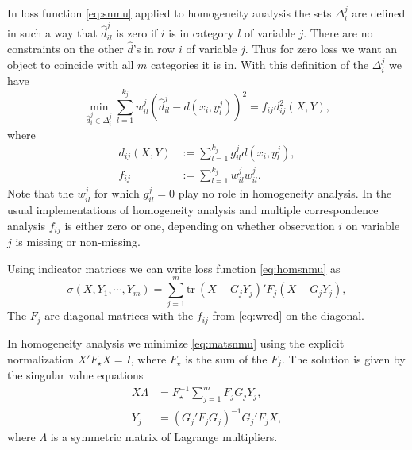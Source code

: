 \documentclass[
  12pt,
]{article}
\begin{document}
In loss function \eqref{eq:snmu} applied to homogeneity analysis
the sets \(\Delta_i^j\) are defined in such a way that \(\hat d_{il}^j\) is zero if \(i\) is in category \(l\) of
variable \(j\). There are no constraints on the other \(\hat d\)'s in row \(i\)
of variable \(j\). Thus for zero loss we want an object to coincide with all \(m\) categories it is in. With this definition of the \(\Delta_i^j\) we have
\begin{equation}
\min_{\hat d_i^j\in\Delta_i^j}\sum_{l=1}^{k_j}w_{il}^j(\hat d_{il}^j-d(x_i,y_l^j))^2=f_{ij}d_{ij}^2(X,Y),
\label{eq:homsnmu}
\end{equation}
where
\begin{subequations}
\begin{align}
d_{ij}(X,Y)&:=\sum_{l=1}^{k_j}g_{il}^jd(x_i,y^j_l),\label{eq:dred}\\
f_{ij}&:=\sum_{l=1}^{k_j}w^j_{il}w^j_{il}.\label{eq:wred}
\end{align}
\end{subequations}
Note that the \(w^j_{il}\) for which \(g^j_{il}=0\) play no role in
homogeneity analysis. In the usual implementations of homogeneity
analysis and multiple correspondence analysis
\(f_{ij}\) is either zero or one, depending on whether observation
\(i\) on variable \(j\) is missing or non-missing.

Using indicator matrices we can write loss function \eqref{eq:homsnmu} as
\begin{equation}
\sigma(X,Y_1,\cdots,Y_m)=
\sum_{j=1}^m\text{tr}\ (X-G_jY_j)'F_j(X-G_jY_j),
\label{eq:matsnmu}
\end{equation}
The \(F_j\) are diagonal matrices with the \(f_{ij}\) from \eqref{eq:wred}
on the diagonal.

In homogeneity analysis we minimize \eqref{eq:matsnmu} using the
explicit normalization \(X'F_\star X=I\), where \(F_\star\) is the
sum of the \(F_j\). The solution is given by the singular value
equations
\begin{subequations}
\begin{align}
X\Lambda&=F_\star^{-1}\sum_{j=1}^m F_jG_jY_j,\label{eq:homsvd1}\\
Y_j&=(G_j'F_jG_j)^{-1}G_j'F_jX,\label{eq:homsvd2}
\end{align}
\end{subequations}
where \(\Lambda\) is a symmetric matrix of Lagrange multipliers.
\end{document}
